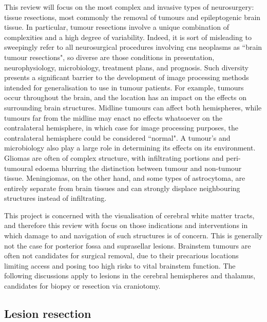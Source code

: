 This review will focus on the most complex and invasive types of neurosurgery: tissue resections, most commonly the removal of tumours and epileptogenic brain tissue. 
In particular, tumour resections involve a unique combination of complexities and a high degree of variability.
Indeed, it is sort of misleading to sweepingly refer to all neurosurgical procedures involving  \gls{cns} neoplasms as ``brain tumour resections", so diverse are those conditions in presentation, neurophysiology, microbiology, treatment plans, and prognosis.
Such diversity presents a significant barrier to the development of image processing methods intended for generalisation to use in tumour patients.
For example, tumours occur throughout the brain, and the location has an impact on the effects on surrounding brain structures.
Midline tumours can affect both hemispheres, while tumours far from the midline may enact no effects whatsoever on the contralateral hemisphere, in which case for image processing purposes, the contralateral hemisphere could be considered ``normal".
A tumour's  and microbiology also play a large role in determining its effects on its environment.
Gliomas are often of complex structure, with infiltrating portions and peri-tumoural edoema blurring the distinction between tumour and non-tumour tissue.
Meningiomas, on the other hand, and some types of astrocytoma, are entirely  separate from brain tissues and can strongly displace neighbouring structures instead of infiltrating.

This project is concerned with the visualisation of cerebral white matter tracts, and therefore this review with focus on those indications and interventions in which damage to and navigation of such structures is of concern.
This is generally not the case for posterior fossa and suprasellar lesions.
Brainstem tumours are often not candidates for surgical removal, due to their precarious locations limiting access and posing too high risks to vital brainstem function.
The following discussions apply to lesions in the cerebral hemispheres and thalamus, candidates for biopsy or resection via craniotomy.

\subsection{Lesion resection}



